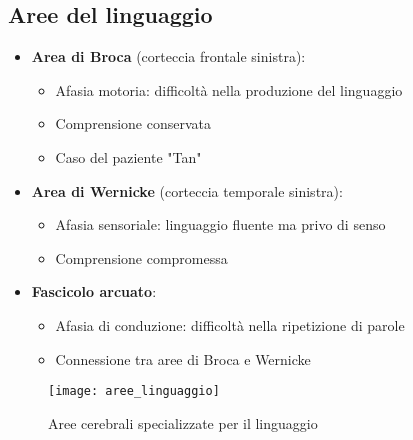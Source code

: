 \documentclass[11pt]{article}
\begin{document}
\subsection*{Aree del linguaggio}
\begin{itemize}
    \item \textbf{Area di Broca} (corteccia frontale sinistra):
    \begin{itemize}
        \item Afasia motoria: difficoltà nella produzione del linguaggio
        \item Comprensione conservata
        \item Caso del paziente "Tan"
    \end{itemize}
    
    \item \textbf{Area di Wernicke} (corteccia temporale sinistra):
    \begin{itemize}
        \item Afasia sensoriale: linguaggio fluente ma privo di senso
        \item Comprensione compromessa
    \end{itemize}
    
    \item \textbf{Fascicolo arcuato}:
    \begin{itemize}
        \item Afasia di conduzione: difficoltà nella ripetizione di parole
        \item Connessione tra aree di Broca e Wernicke
    \end{itemize}
\end{itemize}

\begin{figure}[h]
    \centering
    \texttt{[image: aree\_linguaggio]} %
    \caption{Aree cerebrali specializzate per il linguaggio}
    \label{fig:linguaggio}
\end{figure}
\end{document}
